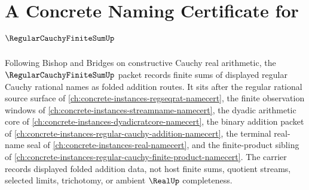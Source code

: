 \chapter{A Concrete Naming Certificate for $\RegularCauchyFiniteSumUp$}
\label{ch:concrete-instances-regular-cauchy-finite-sum-namecert}

Following Bishop and Bridges on constructive Cauchy real arithmetic, the $\RegularCauchyFiniteSumUp$ packet records finite sums of displayed regular Cauchy rational names as folded addition routes. It sits after the regular rational source surface of \autoref{ch:concrete-instances-regseqrat-namecert}, the finite observation windows of \autoref{ch:concrete-instances-streamname-namecert}, the dyadic arithmetic core of \autoref{ch:concrete-instances-dyadicratcore-namecert}, the binary addition packet of \autoref{ch:concrete-instances-regular-cauchy-addition-namecert}, the terminal real-name seal of \autoref{ch:concrete-instances-real-namecert}, and the finite-product sibling of \autoref{ch:concrete-instances-regular-cauchy-finite-product-namecert}. The carrier records displayed folded addition data, not host finite sums, quotient streams, selected limits, trichotomy, or ambient $\RealUp$ completeness.

